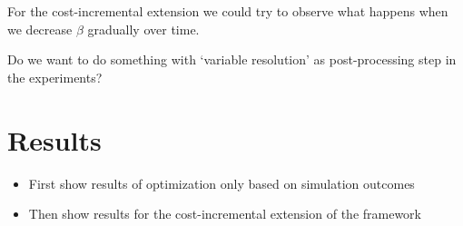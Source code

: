 \vspace{12pt}
\noindent For the cost-incremental extension we could try to observe what happens when we decrease $\beta$ gradually over time.

\vspace{12pt}
\noindent Do we want to do something with `variable resolution' as post-processing step in the experiments?

\vspace{12pt}
\noindent{}

\section{Results}
\label{sec:results}

\begin{itemize}
	\item First show results of optimization only based on simulation outcomes
	\item Then show results for the cost-incremental extension of the framework
\end{itemize}


